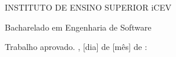 \documentclass[
  12pt,
  openright,
  oneside,
  a4paper,
  english,
  brazil
]{abntex2}
\renewcommand{\imprimircapa}{%
  \begin{capa}%
    \center
    {\ABNTEXchapterfont\large INSTITUTO DE ENSINO SUPERIOR iCEV}\par
    {\ABNTEXchapterfont\large Bacharelado em Engenharia de Software}
    \vspace*{2.5cm}

    {\ABNTEXchapterfont\large\imprimirautor}

    \vfill
    \begin{center}
      \ABNTEXchapterfont\bfseries\LARGE\imprimirtitulo
    \end{center}
    \vfill

    \large\imprimirlocal
    \par
    \large\imprimirdata
    \vspace*{1cm}
  \end{capa}%
}
\renewcommand{\ABNTEXchapterfont}{\rmfamily}
\begin{document}
\frenchspacing


\imprimircapa
\imprimirfolhaderosto*

%  

\begin{folhadeaprovacao}
  \begin{center}
    {\ABNTEXchapterfont\large\imprimirautor}

    \vspace*{\fill}\vspace*{\fill}
    \begin{center}
      \ABNTEXchapterfont\bfseries\Large\imprimirtitulo
    \end{center}
    \vspace*{\fill}

    \hspace{.45\textwidth}
    \begin{minipage}{.5\textwidth}
        \imprimirpreambulo
    \end{minipage}%
    \vspace*{\fill}
   \end{center}

   Trabalho aprovado. \imprimirlocal, [dia] de [mês] de \imprimirdata:


   \begin{center}
    \vspace*{0.5cm}
    {\large\imprimirlocal}
    \par
    {\large\imprimirdata}
    \vspace*{1cm}
  \end{center}
\end{folhadeaprovacao}

\end{document}
